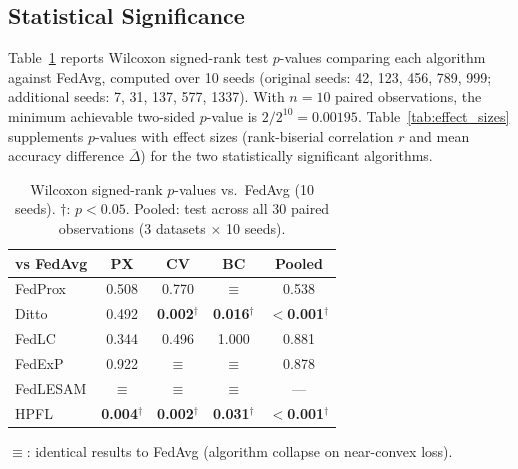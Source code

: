 \documentclass[conference,a4paper]{IEEEtran}
\begin{document}
\subsection{Statistical Significance}

Table~\ref{tab:significance} reports Wilcoxon signed-rank test $p$-values comparing each algorithm against FedAvg, computed over 10 seeds (original seeds: 42, 123, 456, 789, 999; additional seeds: 7, 31, 137, 577, 1337). With $n{=}10$ paired observations, the minimum achievable two-sided $p$-value is $2/2^{10} = 0.00195$. Table~\ref{tab:effect_sizes} supplements $p$-values with effect sizes (rank-biserial correlation $r$ and mean accuracy difference $\overline{\Delta}$) for the two statistically significant algorithms.

\begin{table}[t]
\centering
\caption{Wilcoxon signed-rank $p$-values vs.\ FedAvg (10 seeds). $\dagger$: $p < 0.05$. Pooled: test across all 30 paired observations (3 datasets $\times$ 10 seeds).}
\label{tab:significance}
\small
\begin{tabular}{lcccc}
\toprule
\textbf{vs FedAvg} & \textbf{PX} & \textbf{CV} & \textbf{BC} & \textbf{Pooled} \\
\midrule
FedProx & 0.508 & 0.770 & $\equiv$ & 0.538 \\
Ditto & 0.492 & \textbf{0.002}$^\dagger$ & \textbf{0.016}$^\dagger$ & \textbf{$<$0.001}$^\dagger$ \\
FedLC & 0.344 & 0.496 & 1.000 & 0.881 \\
FedExP & 0.922 & $\equiv$ & $\equiv$ & 0.878 \\
FedLESAM & $\equiv$ & $\equiv$ & $\equiv$ & --- \\
HPFL & \textbf{0.004}$^\dagger$ & \textbf{0.002}$^\dagger$ & \textbf{0.031}$^\dagger$ & \textbf{$<$0.001}$^\dagger$ \\
\bottomrule
\end{tabular}

\vspace{1mm}
\footnotesize{$\equiv$: identical results to FedAvg (algorithm collapse on near-convex loss).}
\end{table}
\end{document}
